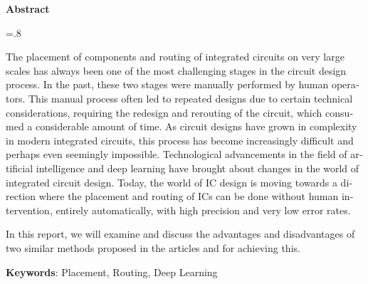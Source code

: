 


\pagestyle{empty}

\begin{latin}

\begin{center}
\textbf{Abstract}
\end{center}
\baselineskip=.8\baselineskip

The placement of components and routing of integrated circuits on very large scales has always been one of the most challenging stages in the circuit design process. In the past, these two stages were manually performed by human operators. This manual process often led to repeated designs due to certain technical considerations, requiring the redesign and rerouting of the circuit, which consumed a considerable amount of time. As circuit designs have grown in complexity in modern integrated circuits, this process has become increasingly difficult and perhaps even seemingly impossible. Technological advancements in the field of artificial intelligence and deep learning have brought about changes in the world of integrated circuit design. Today, the world of IC design is moving towards a direction where the placement and routing of ICs can be done without human intervention, entirely automatically, with high precision and very low error rates.

In this report, we will examine and discuss the advantages and disadvantages of two similar methods proposed in the articles \cite{article1} and \cite{article2} for achieving this.


\bigskip\noindent\textbf{Keywords}:
Placement, Routing, Deep Learning

\end{latin}
